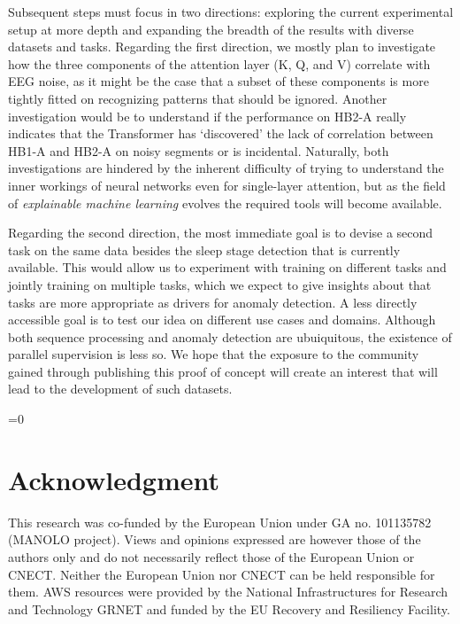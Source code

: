 \documentclass[conference]{IEEEtran}
\def\anon{1}
\begin{document}
Subsequent steps must focus in two directions: exploring the current
experimental setup at more depth and expanding the breadth of the
results with diverse datasets and tasks. Regarding the first direction,
we mostly plan to investigate how the three components of the attention
layer (K, Q, and V) correlate with EEG noise, as it might be the case
that a subset of these components is more tightly fitted on
recognizing patterns that should be ignored. Another investigation
would be to understand if the performance on HB2-A really indicates
that the Transformer has `discovered' the lack of correlation between
HB1-A and HB2-A on noisy segments or is incidental. Naturally, both
investigations are hindered by the inherent difficulty of trying to
understand the inner workings of neural networks even for single-layer
attention, but as the field of \emph{explainable machine learning}
evolves the required tools will become available.

Regarding the second direction, the most immediate goal is to devise a
second task on the same data besides the sleep stage detection that is
currently available. This would allow us to experiment with training
on different tasks and jointly training on multiple tasks, which we
expect to give insights about that tasks are more appropriate as
drivers for anomaly detection. A less directly accessible goal is to
test our idea on different use cases and domains. Although both
sequence processing and anomaly detection are ubuiquitous, the
existence of parallel supervision is less so. We hope that the
exposure to the community gained through publishing this proof of
concept will create an interest that will lead to the development of
such datasets.




\ifnum\anon=0

\section*{Acknowledgment}

This research was co-funded by the European Union under GA no. 101135782 (MANOLO project). Views and opinions expressed are however those of the authors only and do not necessarily reflect those of the European Union or CNECT. Neither the European Union nor CNECT can be held responsible for them. AWS resources were provided by the National Infrastructures for Research and Technology GRNET and funded by the EU Recovery and Resiliency Facility.

\fi




\end{document}
